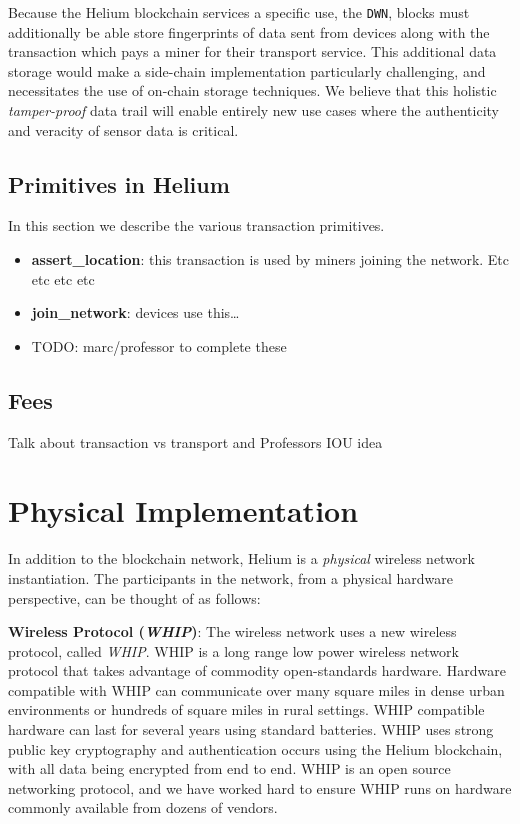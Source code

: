 \documentclass[letterpaper,11pt]{article}
\newcommand{\todo}[1]{}
\renewcommand{\todo}[1]{{\color{red} TODO: {#1}}}
\begin{document}
Because the Helium blockchain services a specific use, the \verb|DWN|, blocks must additionally be able store fingerprints of data sent from devices along with the transaction which pays a miner for their transport service. This additional data storage would make a side-chain implementation particularly challenging, and necessitates the use of on-chain storage techniques. We believe that this holistic \emph{tamper-proof} data trail will enable entirely new use cases where the authenticity and veracity of sensor data is critical.

\subsection{Primitives in Helium}

In this section we describe the various transaction primitives.

\begin{itemize}
  \item \textbf{assert\_location}: this transaction is used by miners joining the network. Etc etc etc etc
  \item \textbf{join\_network}: devices use this\ldots
  \item \todo{marc/professor to complete these}
\end{itemize}

\subsection{Fees}

Talk about transaction vs transport and Professors IOU idea

\newpage

\section{Physical Implementation}

In addition to the blockchain network, Helium is a \emph{physical} wireless network instantiation. The participants in the network, from a physical hardware perspective, can be thought of as follows:\newline

\textbf{Wireless Protocol (\emph{WHIP})}: The wireless network uses a new wireless protocol, called \emph{WHIP}. WHIP is a long range low power wireless network protocol that takes advantage of commodity open-standards hardware. Hardware compatible with WHIP can communicate over many square miles in dense urban environments or hundreds of square miles in rural settings. WHIP compatible hardware can last for several years using standard batteries. WHIP uses strong public key cryptography and authentication occurs using the Helium blockchain, with all data being encrypted from end to end. WHIP is an open source networking protocol, and we have worked hard to ensure WHIP runs on hardware commonly available from dozens of vendors.\newline
\end{document}
